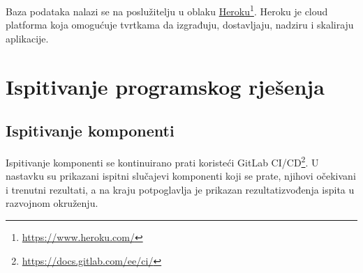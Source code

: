 			Baza podataka nalazi se na poslužitelju u oblaku \underline{Heroku}\footnote{\url{https://www.heroku.com/}}. Heroku je cloud platforma koja omogućuje tvrtkama da izgrađuju, dostavljaju, nadziru i skaliraju aplikacije.
			
			\eject 

		
	
		\section{Ispitivanje programskog rješenja}
			
%			
	
			\clearpage
			\subsection{Ispitivanje komponenti}
			
			Ispitivanje komponenti  se kontinuirano prati koristeći GitLab CI/CD\footnote{\url{https://docs.gitlab.com/ee/ci/}}. 
			U nastavku su prikazani ispitni slučajevi komponenti koji se prate, njihovi očekivani i trenutni rezultati, a na kraju potpoglavlja je prikazan rezultatizvođenja ispita u razvojnom okruženju.  \\
			
